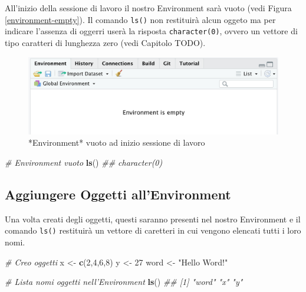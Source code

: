 \documentclass[
]{book}
\newenvironment{Shaded}{\begin{snugshade}}{\end{snugshade}}
\newcommand{\CommentTok}[1]{\textcolor[rgb]{0.56,0.35,0.01}{\textit{#1}}}
\newcommand{\DecValTok}[1]{\textcolor[rgb]{0.00,0.00,0.81}{#1}}
\newcommand{\KeywordTok}[1]{\textcolor[rgb]{0.13,0.29,0.53}{\textbf{#1}}}
\newcommand{\NormalTok}[1]{#1}
\newcommand{\StringTok}[1]{\textcolor[rgb]{0.31,0.60,0.02}{#1}}
\begin{document}
All'inizio della sessione di lavoro il nostro Environment sarà vuoto (vedi Figura \ref{environment-empty}). Il comando \texttt{ls()} non restituirà alcun oggeto ma per indicare l'assenza di oggerri userà la risposta \texttt{character(0)}, ovvero un vettore di tipo caratteri di lunghezza zero (vedi Capitolo TODO).

\begin{figure}

{\centering \includegraphics[width=0.6\linewidth]{images/environment-empty} 

}

\caption{*Environment* vuoto ad inizio sessione di lavoro}\label{fig:environment-empty}
\end{figure}

\begin{Shaded}
\begin{Highlighting}[]
\CommentTok{# Environment vuoto}
\KeywordTok{ls}\NormalTok{()}
\CommentTok{## character(0)}
\end{Highlighting}
\end{Shaded}

\hypertarget{aggiungere-oggetti-allenvironment}{%
\subsection{Aggiungere Oggetti all'Environment}\label{aggiungere-oggetti-allenvironment}}

Una volta creati degli oggetti, questi saranno presenti nel nostro Environment e il comando \texttt{ls()} restituirà un vettore di caretteri in cui vengono elencati tutti i loro nomi.

\begin{Shaded}
\begin{Highlighting}[]
\CommentTok{# Creo oggetti}
\NormalTok{x <-}\StringTok{  }\KeywordTok{c}\NormalTok{(}\DecValTok{2}\NormalTok{,}\DecValTok{4}\NormalTok{,}\DecValTok{6}\NormalTok{,}\DecValTok{8}\NormalTok{)}
\NormalTok{y <-}\StringTok{  }\DecValTok{27}
\NormalTok{word <-}\StringTok{ "Hello Word!"}

\CommentTok{# Lista nomi oggetti nell'Environment}
\KeywordTok{ls}\NormalTok{()}
\CommentTok{## [1] "word" "x"    "y"}
\end{Highlighting}
\end{Shaded}
\end{document}
